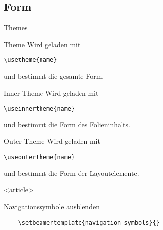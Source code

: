 
\subsection{Form}

\begin{Frame}[fragile]{Themes}
  \begin{Block}{Theme}
    Wird geladen mit
    \begin{lstlisting}[gobble=6,style=block]
      \usetheme{name}
    \end{lstlisting}
    und bestimmt die \alert{gesamte Form}.
  \end{Block}

  \begin{Block}{Inner Theme}
    Wird geladen mit
    \begin{lstlisting}[gobble=6,style=block]
      \useinnertheme{name}
    \end{lstlisting}
    und bestimmt die \alert{Form des Folieninhalts}.
  \end{Block}

  \begin{Block}{Outer Theme}
    Wird geladen mit
    \begin{lstlisting}[gobble=6,style=block]
      \useoutertheme{name}
    \end{lstlisting}
    und bestimmt die \alert{Form der Layoutelemente}.
  \end{Block}
\end{Frame}








\mode
<article>

\begin{Block}{Navigationssymbole ausblenden}
  \begin{lstlisting}[gobble=4]
    % hide navigation symbols
    \setbeamertemplate{navigation symbols}{}
  \end{lstlisting}
\end{Block}


